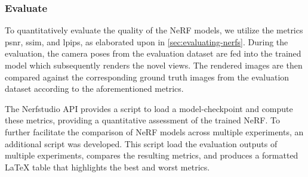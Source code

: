 \begin{comment}
During the training of a NeRF, a batch of pixels is created for each training iteration. By default, this batch consists of 4096 pixels. To obtain these pixels, the training algorithm randomly samples them from all of the training images that are stored in RAM. However, this approach can be memory-intensive, especially when dealing with large datasets. To address this issue, the NeRF pipeline provides an option to set the parameter \texttt{–-pipeline.datamanager.train-num-images-to-sample-from}, which allows the user to sample pixels from a smaller subset of images. When using a smaller subset of images, the training algorithm will keep sampling from this subset unless the parameter \texttt{--num-times-to-repeat-images} is also set. This parameter specifies the number of training iterations after which the training algorithm should grab a new set of images to sample from. For instance, if \texttt{--num-times-to-repeat-images} is set to 1, the training algorithm will grab a new set of images to sample from every iteration. However, this approach can be computationally expensive and slow down the training process.
\end{comment}




\subsubsection{Evaluate}
To quantitatively evaluate the quality of the NeRF models, we utilize the metrics \acrshort{psnr}, \acrshort{ssim}, and \acrshort{lpips}, as elaborated upon in \autoref{sec:evaluating-nerfs}. During the evaluation, the camera poses from the evaluation dataset are fed into the trained model which subsequently renders the novel views. The rendered images are then compared against the corresponding ground truth images from the evaluation dataset according to the aforementioned metrics. 

The Nerfstudio API provides a script to load a model-checkpoint and compute these metrics, providing a quantitative assessment of the trained NeRF. To further facilitate the comparison of NeRF models across multiple experiments, an additional script was developed. This script load the evaluation outputs of multiple experiments, compares the resulting metrics, and produces a formatted LaTeX table that highlights the best and worst metrics.

%

